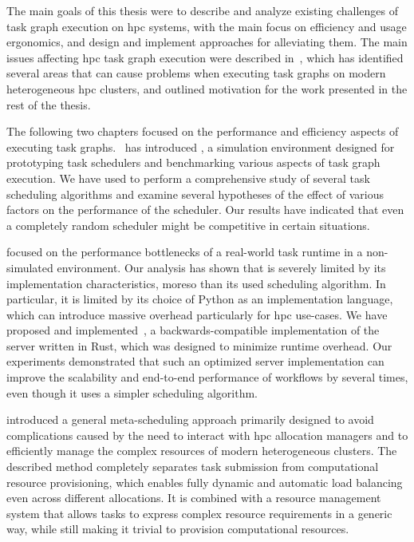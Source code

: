 The main goals of this thesis were to describe and analyze existing challenges of task graph
execution on \gls{hpc} systems, with the main focus on efficiency and usage
ergonomics, and design and implement approaches for alleviating them. The main issues affecting
\gls{hpc} task graph execution were described in~, which
has identified several areas that can cause problems when executing task graphs on modern
heterogeneous \gls{hpc} clusters, and outlined motivation for the work presented in
the rest of the thesis.

The following two chapters focused on the performance and efficiency aspects of executing task
graphs.~ has introduced \estee{}, a simulation
environment designed for prototyping task schedulers and benchmarking various aspects of task graph
execution. We have used \estee{} to perform a comprehensive study of several task
scheduling algorithms and examine several hypotheses of the effect of various factors on the
performance of the scheduler. Our results have
indicated that even a completely random scheduler might be competitive in certain situations.


 focused on the performance bottlenecks of a real-world task runtime
\dask{} in a non-simulated environment. Our analysis
has shown that \dask{} is severely limited by its implementation
characteristics, moreso than its used scheduling algorithm. In particular, it is limited by its choice of Python as
an implementation language, which can introduce massive overhead particularly for
\gls{hpc} use-cases. We have proposed and implemented~\rsds{},
a backwards-compatible implementation of the \dask{} server written in Rust,
which was designed to minimize runtime overhead. Our experiments demonstrated that such
an optimized server implementation can improve the scalability and end-to-end performance of
\dask{} workflows by several times, even though it uses a simpler scheduling
algorithm.

 introduced a
general meta-scheduling approach primarily designed to avoid complications caused by the need to
interact with \gls{hpc} allocation managers and to efficiently manage the complex resources
of modern heterogeneous clusters. The described method completely separates task submission from
computational resource provisioning, which enables fully dynamic and automatic load balancing even
across different allocations. It is combined with a resource management system that allows tasks to
express complex resource requirements in a generic way, while still making it trivial to provision
computational resources.

